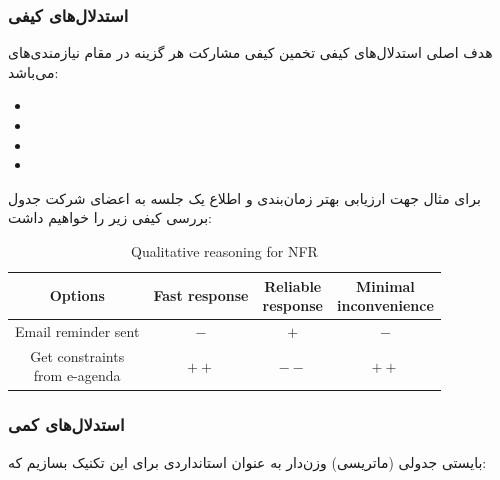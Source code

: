 \subsubsection{استدلال‌های کیفی }

هدف اصلی استدلال‌های کیفی تخمین کیفی مشارکت هر گزینه در مقام نیازمندی‌های
 می‌باشد:

\begin{itemize}
    \item {}
    \item {}
    \item {}
    \item {}
\end{itemize}

برای مثال جهت ارزیابی بهتر زمان‌بندی و اطلاع یک جلسه به اعضای شرکت جدول بررسی
کیفی زیر را خواهیم داشت:

\begin{LTR}
    \begin{table}[H]
        \centering
        \begin{tabular}{cccc}
            Options & Fast response & \makecell{Reliable \\ response} & \makecell{Minimal \\ inconvenience} \\ \hline
            Email reminder sent & $-$ & $+$ & $-$ \\ \hline
            \makecell{Get constraints \\ from e-agenda} & $++$ & $--$ & $++$ \\ \hline
        \end{tabular}
        \caption{Qualitative reasoning for NFR}
        \label{fig:qualitativeReasoningNFR}
    \end{table}
\end{LTR} \subsubsection{‌استدلال‌های کمی }

بایستی جدولی (ماتریسی) وزن‌دار به عنوان استانداردی برای این تکنیک بسازیم که:

